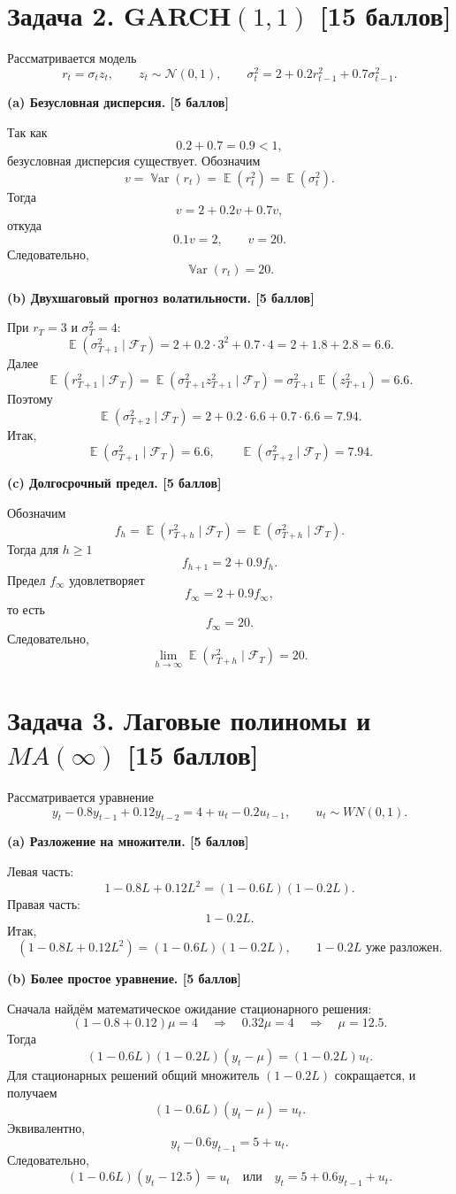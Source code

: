 \documentclass[12pt]{article}
\DeclareMathOperator{\Var}{\mathbb{V}ar}
\DeclareMathOperator{\E}{\mathbb{E}}
\newcommand \cN{\mathcal{N}}
\newcommand{\cF}{\mathcal{F}}
\newcommand{\step}[1]{\medskip\noindent\textbf{#1}\par\nobreak\vspace{2pt}}
\begin{document}
\section*{Задача 2. GARCH$(1,1)$ \hfill [15 баллов]}

Рассматривается модель
\[
r_t=\sigma_t z_t,\qquad z_t\sim\cN(0,1),\qquad
\sigma_t^2=2+0.2r_{t-1}^2+0.7\sigma_{t-1}^2.
\]

\step{(a) Безусловная дисперсия. \hfill [5 баллов]}
Так как
\[
0.2+0.7=0.9<1,
\]
безусловная дисперсия существует. Обозначим
\[
v=\Var(r_t)=\E(r_t^2)=\E(\sigma_t^2).
\]
Тогда
\[
v=2+0.2v+0.7v,
\]
откуда
\[
0.1v=2,\qquad v=20.
\]
Следовательно,
\[
\boxed{\Var(r_t)=20.}
\]

\step{(b) Двухшаговый прогноз волатильности. \hfill [5 баллов]}
При $r_T=3$ и $\sigma_T^2=4$:
\[
\E(\sigma_{T+1}^2\mid\cF_T)=2+0.2\cdot 3^2+0.7\cdot 4=2+1.8+2.8=6.6.
\]
Далее
\[
\E(r_{T+1}^2\mid\cF_T)=\E(\sigma_{T+1}^2 z_{T+1}^2\mid\cF_T)
=\sigma_{T+1}^2 \E(z_{T+1}^2)=6.6.
\]
Поэтому
\[
\E(\sigma_{T+2}^2\mid\cF_T)=2+0.2\cdot 6.6+0.7\cdot 6.6=7.94.
\]
Итак,
\[
\boxed{\E(\sigma_{T+1}^2\mid\cF_T)=6.6,\qquad \E(\sigma_{T+2}^2\mid\cF_T)=7.94.}
\]

\step{(c) Долгосрочный предел. \hfill [5 баллов]}
Обозначим
\[
f_h=\E(r_{T+h}^2\mid\cF_T)=\E(\sigma_{T+h}^2\mid\cF_T).
\]
Тогда для $h\ge 1$
\[
f_{h+1}=2+0.9f_h.
\]
Предел $f_\infty$ удовлетворяет
\[
f_\infty=2+0.9f_\infty,
\]
то есть
\[
f_\infty=20.
\]
Следовательно,
\[
\boxed{\lim_{h\to\infty}\E(r_{T+h}^2\mid\cF_T)=20.}
\]

\section*{Задача 3. Лаговые полиномы и $MA(\infty)$ \hfill [15 баллов]}

Рассматривается уравнение
\[
y_t-0.8y_{t-1}+0.12y_{t-2}=4+u_t-0.2u_{t-1},
\qquad
u_t\sim WN(0,1).
\]

\step{(a) Разложение на множители. \hfill [5 баллов]}
Левая часть:
\[
1-0.8L+0.12L^2=(1-0.6L)(1-0.2L).
\]
Правая часть:
\[
1-0.2L.
\]
Итак,
\[
\boxed{(1-0.8L+0.12L^2)=(1-0.6L)(1-0.2L),\qquad 1-0.2L \text{ уже разложен.}}
\]

\step{(b) Более простое уравнение. \hfill [5 баллов]}
Сначала найдём математическое ожидание стационарного решения:
\[
(1-0.8+0.12)\mu=4 \quad \Longrightarrow \quad 0.32\mu=4 \quad \Longrightarrow \quad \mu=12.5.
\]
Тогда
\[
(1-0.6L)(1-0.2L)(y_t-\mu)=(1-0.2L)u_t.
\]
Для стационарных решений общий множитель $(1-0.2L)$ сокращается, и получаем
\[
(1-0.6L)(y_t-\mu)=u_t.
\]
Эквивалентно,
\[
y_t-0.6y_{t-1}=5+u_t.
\]
Следовательно,
\[
\boxed{(1-0.6L)(y_t-12.5)=u_t}
\quad\text{или}\quad
\boxed{y_t=5+0.6y_{t-1}+u_t.}
\]
\end{document}
